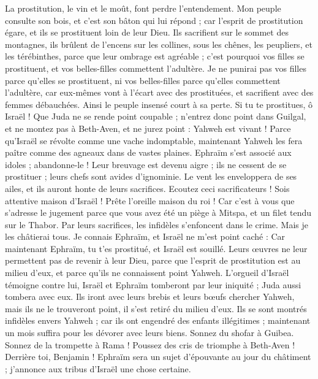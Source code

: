 \begin{multicols}{2}
La prostitution, le vin et le moût, font perdre l'entendement.
Mon peuple consulte son bois, et c’est son bâton qui lui répond ; car l'esprit de prostitution égare, et ils se prostituent loin de leur Dieu.
Ils sacrifient sur le sommet des montagnes, ils brûlent de l’encens sur les collines, sous les chênes, les peupliers, et les térébinthes, parce que leur ombrage est agréable ; c'est pourquoi vos filles se prostituent, et vos belles-filles commettent l'adultère.
Je ne punirai pas vos filles parce qu’elles se prostituent, ni vos belles-filles parce qu’elles commettent l’adultère, car eux-mêmes vont à l’écart avec des prostituées, et sacrifient avec des femmes débauchées. Ainsi le peuple insensé court à sa perte.
Si tu te prostitues, ô Israël ! Que Juda ne se rende point coupable ; n'entrez donc point dans Guilgal, et ne montez pas à Beth-Aven, et ne jurez point : Yahweh est vivant !
Parce qu'Israël se révolte comme une vache indomptable, maintenant Yahweh les fera paître comme des agneaux dans de vastes plaines.
Ephraïm s'est associé aux idoles ; abandonne-le !
Leur breuvage est devenu aigre ; ils ne cessent de se prostituer ; leurs chefs sont avides d’ignominie.
Le vent les enveloppera de ses ailes, et ils auront honte de leurs sacrifices.
\VerseOne{}Ecoutez ceci sacrificateurs ! Sois attentive maison d'Israël ! Prête l'oreille maison du roi ! Car c’est à vous que s’adresse le jugement parce que vous avez été un piège à Mitspa, et un filet tendu sur le Thabor.
Par leurs sacrifices, les infidèles s’enfoncent dans le crime. Mais je les châtierai tous.
Je connais Ephraïm, et Israël ne m'est point caché : Car maintenant Ephraïm, tu t’es prostitué, et Israël est souillé.
Leurs œuvres ne leur permettent pas de revenir à leur Dieu, parce que l'esprit de prostitution est au milieu d'eux, et parce qu’ils ne connaissent point Yahweh.
L’orgueil d'Israël témoigne contre lui, Israël et Ephraïm tomberont par leur iniquité ; Juda aussi tombera avec eux.
Ils iront avec leurs brebis et leurs bœufs chercher Yahweh, mais ils ne le trouveront point, il s'est retiré du milieu d’eux.
Ils se sont montrés infidèles envers Yahweh ; car ils ont engendré des enfants illégitimes ; maintenant un mois suffira pour les dévorer avec leurs biens.
Sonnez du shofar à Guibea. Sonnez de la trompette à Rama ! Poussez des cris de triomphe à Beth-Aven ! Derrière toi, Benjamin !
Ephraïm sera un sujet d’épouvante au jour du châtiment ; j’annonce aux tribus d'Israël une chose certaine.

\end{multicols}
